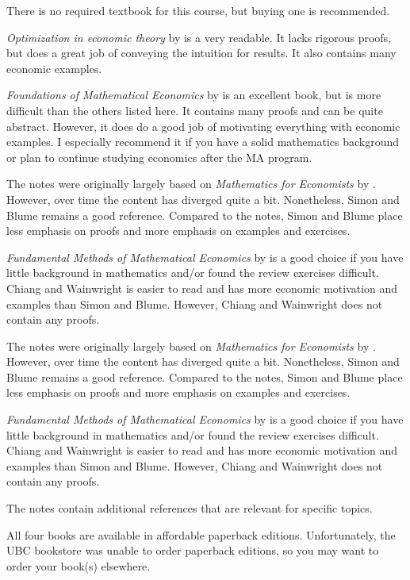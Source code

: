 \documentclass[10pt]{article}
\renewcommand{\cite}{\citet}
\begin{document}
There is no required textbook for this course, but buying one is
recommended.  

\textit{Optimization in economic theory} by \cite{dixit1990} is a very
readable. It lacks rigorous proofs, but does a great job of conveying
the intuition for results. It also contains many economic examples. 

\textit{Foundations of Mathematical Economics} by \cite{carter2001} is
an excellent book, but is more difficult than the others listed
here. It contains many proofs and can be quite abstract. However, it
does do a good job of motivating everything with economic examples. I
especially recommend it if you have a solid mathematics background or
plan to continue studying economics after the MA program.

The notes were originally largely based on \textit{Mathematics for
  Economists} by \cite{sb1994}. However, over time the content has
diverged quite a bit. Nonetheless, Simon and Blume remains a good
reference. Compared to the notes, Simon and Blume place less emphasis
on proofs and more emphasis on examples and exercises. 

\textit{Fundamental Methods of Mathematical Economics} by
\cite{cw2005} is a good choice if you have little background in
mathematics and/or found the review exercises difficult. Chiang and
Wainwright is easier to read and has more economic motivation and
examples than Simon and Blume. However, Chiang and Wainwright does not
contain any proofs.

The notes were originally largely based on \textit{Mathematics for
  Economists} by \cite{sb1994}. However, over time the content has
diverged quite a bit. Nonetheless, Simon and Blume remains a good
reference. Compared to the notes, Simon and Blume place less emphasis
on proofs and more emphasis on examples and exercises. 

\textit{Fundamental Methods of Mathematical Economics} by
\cite{cw2005} is a good choice if you have little background in
mathematics and/or found the review exercises difficult. Chiang and
Wainwright is easier to read and has more economic motivation and
examples than Simon and Blume. However, Chiang and Wainwright does not
contain any proofs.

The notes contain additional references that are relevant for specific
topics. 

All four books are available in affordable paperback
editions. Unfortunately, the UBC bookstore was unable to order
paperback editions, so you may want to order your book(s) elsewhere. 
\end{document}
